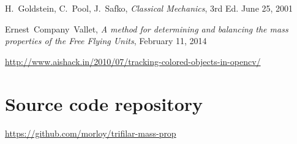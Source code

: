 \documentclass[journal]{IEEEtran}
\begin{document}


%
%
%
\begin{thebibliography}{1}

H.~Goldstein, C.~Pool, J.~Safko, \emph{Classical Mechanics}, 3rd Ed. June 25, 2001

Ernest~Company~Vallet, \emph{A method for determining and balancing the mass properties of
the Free Flying Units}, February 11, 2014

\url{http://www.aishack.in/2010/07/tracking-colored-objects-in-opencv/}

\section*{Source code repository}
\url{https://github.com/morloy/trifilar-mass-prop}

\end{thebibliography}

% 
\end{document}
